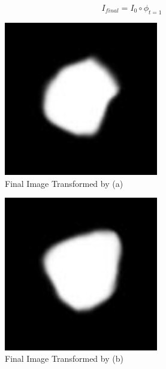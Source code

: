 \documentclass[11pt]{article}
\begin{document}
\begin{enumerate}
\begin{equation}
I_{final}=I_{0}\circ \phi_{t=1}
\end{equation}


\begin{figure}[h]
	\begin{center}
		\includegraphics[width=0.6\textwidth]{./code/result_a}
		\caption{Final Image Transformed by (a)}
		\label{fig:f_res_a}
	\end{center}
\end{figure}


\begin{figure}[h]
	\begin{center}
		\includegraphics[width=0.6\textwidth]{./code/result_b}
		\caption{Final Image Transformed by (b)}
		\label{fig:f_res_b}
	\end{center}
\end{figure}




\end{enumerate}
\end{document}
